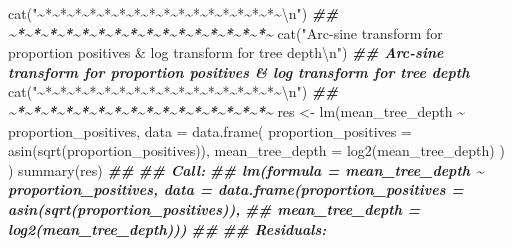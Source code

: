 \documentclass[
  11pt,
  oneside]{book}
\newenvironment{Shaded}{\begin{snugshade}}{\end{snugshade}}
\newcommand{\AttributeTok}[1]{\textcolor[rgb]{0.77,0.63,0.00}{#1}}
\newcommand{\DocumentationTok}[1]{\textcolor[rgb]{0.56,0.35,0.01}{\textbf{\textit{#1}}}}
\newcommand{\FunctionTok}[1]{\textcolor[rgb]{0.00,0.00,0.00}{#1}}
\newcommand{\NormalTok}[1]{#1}
\newcommand{\OtherTok}[1]{\textcolor[rgb]{0.56,0.35,0.01}{#1}}
\newcommand{\SpecialCharTok}[1]{\textcolor[rgb]{0.00,0.00,0.00}{#1}}
\newcommand{\StringTok}[1]{\textcolor[rgb]{0.31,0.60,0.02}{#1}}
\begin{document}
\begin{Shaded}
\begin{Highlighting}[]
\FunctionTok{cat}\NormalTok{(}\StringTok{"\textasciitilde{}*\textasciitilde{}*\textasciitilde{}*\textasciitilde{}*\textasciitilde{}*\textasciitilde{}*\textasciitilde{}*\textasciitilde{}*\textasciitilde{}*\textasciitilde{}*\textasciitilde{}*\textasciitilde{}*\textasciitilde{}*\textasciitilde{}*\textasciitilde{}*\textasciitilde{}*\textasciitilde{}}\SpecialCharTok{\textbackslash{}n}\StringTok{"}\NormalTok{)}
\DocumentationTok{\#\# \textasciitilde{}*\textasciitilde{}*\textasciitilde{}*\textasciitilde{}*\textasciitilde{}*\textasciitilde{}*\textasciitilde{}*\textasciitilde{}*\textasciitilde{}*\textasciitilde{}*\textasciitilde{}*\textasciitilde{}*\textasciitilde{}*\textasciitilde{}*\textasciitilde{}*\textasciitilde{}*\textasciitilde{}}
\FunctionTok{cat}\NormalTok{(}\StringTok{"Arc{-}sine transform for proportion positives \& log transform for tree depth}\SpecialCharTok{\textbackslash{}n}\StringTok{"}\NormalTok{)}
\DocumentationTok{\#\# Arc{-}sine transform for proportion positives \& log transform for tree depth}
\FunctionTok{cat}\NormalTok{(}\StringTok{"\textasciitilde{}*\textasciitilde{}*\textasciitilde{}*\textasciitilde{}*\textasciitilde{}*\textasciitilde{}*\textasciitilde{}*\textasciitilde{}*\textasciitilde{}*\textasciitilde{}*\textasciitilde{}*\textasciitilde{}*\textasciitilde{}*\textasciitilde{}*\textasciitilde{}*\textasciitilde{}*\textasciitilde{}}\SpecialCharTok{\textbackslash{}n}\StringTok{"}\NormalTok{)}
\DocumentationTok{\#\# \textasciitilde{}*\textasciitilde{}*\textasciitilde{}*\textasciitilde{}*\textasciitilde{}*\textasciitilde{}*\textasciitilde{}*\textasciitilde{}*\textasciitilde{}*\textasciitilde{}*\textasciitilde{}*\textasciitilde{}*\textasciitilde{}*\textasciitilde{}*\textasciitilde{}*\textasciitilde{}*\textasciitilde{}}
\NormalTok{res }\OtherTok{\textless{}{-}} \FunctionTok{lm}\NormalTok{(mean\_tree\_depth }\SpecialCharTok{\textasciitilde{}}\NormalTok{ proportion\_positives,}
  \AttributeTok{data =} \FunctionTok{data.frame}\NormalTok{(}
    \AttributeTok{proportion\_positives =} \FunctionTok{asin}\NormalTok{(}\FunctionTok{sqrt}\NormalTok{(proportion\_positives)),}
    \AttributeTok{mean\_tree\_depth =} \FunctionTok{log2}\NormalTok{(mean\_tree\_depth)}
\NormalTok{  )}
\NormalTok{)}
\FunctionTok{summary}\NormalTok{(res)}
\DocumentationTok{\#\# }
\DocumentationTok{\#\# Call:}
\DocumentationTok{\#\# lm(formula = mean\_tree\_depth \textasciitilde{} proportion\_positives, data = data.frame(proportion\_positives = asin(sqrt(proportion\_positives)), }
\DocumentationTok{\#\#     mean\_tree\_depth = log2(mean\_tree\_depth)))}
\DocumentationTok{\#\# }
\DocumentationTok{\#\# Residuals:}

\end{Highlighting}
\end{Shaded}
\end{document}

